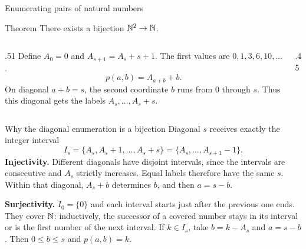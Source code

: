 \begin{frame}{Enumerating pairs of natural numbers}
\begin{block}{Theorem}
There exists a bijection $\mathbb{N}^2\to\mathbb{N}$.
\end{block}
\begin{columns}[T]
\begin{column}{.51\textwidth}
Define $A_0=0$ and $A_{s+1}=A_s+s+1$.
The first values are $0,1,3,6,10,\ldots$.
\[
 p(a,b)=A_{a+b}+b.
\]
On diagonal $a+b=s$, the second coordinate $b$ runs from $0$ through $s$.
Thus this diagonal gets the labels $A_s,\ldots,A_s+s$.
\end{column}
\begin{column}{.45\textwidth}
\centering
{}
\end{column}
\end{columns}
\end{frame}

\begin{frame}{Why the diagonal enumeration is a bijection}
Diagonal $s$ receives exactly the integer interval
\[
 I_s=\{A_s,A_s+1,\ldots,A_s+s\}
     =\{A_s,\ldots,A_{s+1}-1\}.
\]
\textbf{Injectivity.} Different diagonals have disjoint intervals, since the
intervals are consecutive and $A_s$ strictly increases. Equal labels therefore
have the same $s$. Within that diagonal, $A_s+b$ determines $b$, and then $a=s-b$.
\medskip

\textbf{Surjectivity.} $I_0=\{0\}$ and each interval starts just after the previous one ends.
They cover $\mathbb{N}$: inductively, the successor of a covered number stays in its interval
or is the first number of the next interval.
If $k\in I_s$, take $b=k-A_s$ and $a=s-b$. Then $0\le b\le s$ and $p(a,b)=k$.
\end{frame}

